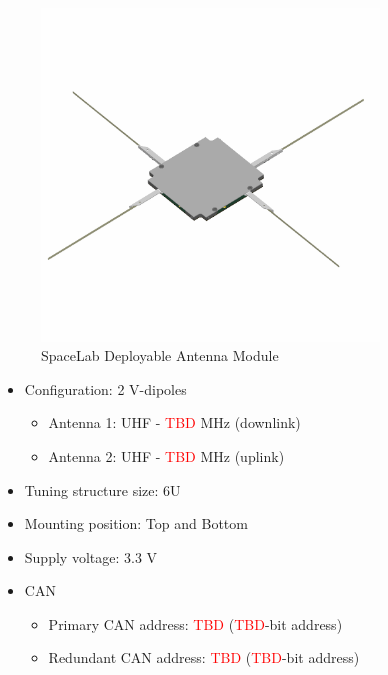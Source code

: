 \begin{figure}[!ht]
    \begin{center}
        \includegraphics[width=0.8\textwidth]{figures/subsystems/sl-antenna.png}
        \caption{SpaceLab Deployable Antenna Module}
        \label{fig:sl-antenna}
    \end{center}
\end{figure}


\begin{itemize}
    \item Configuration: 2 V-dipoles 
        \begin{itemize}
            \item Antenna 1: UHF - \textcolor{red}{TBD} MHz (downlink)
            \item Antenna 2: UHF - \textcolor{red}{TBD} MHz (uplink)
        \end{itemize}
    \item Tuning structure size: 6U
    \item Mounting position: Top and Bottom
    \item Supply voltage: 3.3 V
    \item CAN 
        \begin{itemize}
            \item Primary CAN address: \textcolor{red}{TBD} (\textcolor{red}{TBD}-bit address)
            \item Redundant CAN address: \textcolor{red}{TBD} (\textcolor{red}{TBD}-bit address)
        \end{itemize}
\end{itemize}

